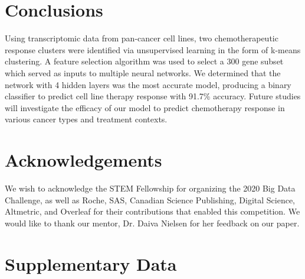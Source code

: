 \documentclass[10pt, letterpaper]{article}
\begin{document}
\begin{multicols*}{2}
\section{Conclusions}
Using transcriptomic data from pan-cancer cell lines, two chemotherapeutic response clusters were identified via unsupervised learning in the form of k-means clustering. A feature selection algorithm was used to select a 300 gene subset which served as inputs to multiple neural networks. We determined that the network with 4 hidden layers was the most accurate model, producing a binary classifier to predict cell line therapy response with 91.7\% accuracy. Future studies will investigate the efficacy of our model to predict chemotherapy response in various cancer types and treatment contexts.


\section*{Acknowledgements}
We wish to acknowledge the STEM Fellowship for organizing the 2020 Big Data Challenge, as well as Roche, SAS, Canadian Science Publishing, Digital Science, Altmetric, and Overleaf for their contributions that enabled this competition. We would like to thank our mentor, Dr. Daiva Nielsen for her feedback on our paper.




\end{multicols*}



\clearpage

\section*{Supplementary Data}
\end{document}
